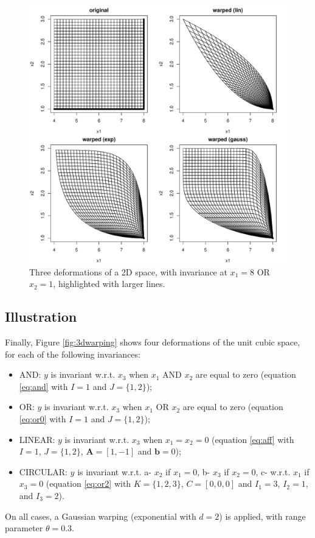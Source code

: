 \begin{figure}[!ht]
\centering
 \includegraphics[width=.8\textwidth]{def2DOR.pdf}
 \caption{Three deformations of a 2D space, with invariance at $x_1=8$ OR $x_2=1$, highlighted with larger lines.}\label{fig:def2DOR}
\end{figure}
% 
% 

\subsection{Illustration}
Finally, Figure \ref{fig:3dwarping} shows four deformations of the unit cubic space, for each of the following invariances:
\begin{itemize}
 \item AND: $y$ is invariant w.r.t. $x_3$ when $x_1$ AND $x_2$ are equal to zero (equation \ref{eq:and} with $I=1$ and $J=\{1,2\}$);
 \item OR: $y$ is invariant w.r.t. $x_3$ when $x_1$ OR $x_2$ are equal to zero  (equation \ref{eq:or0} with $I=1$ and $J=\{1,2\}$);
 \item LINEAR: $y$ is invariant w.r.t. $x_3$ when $x_1=x_2=0$  (equation \ref{eq:aff} with $I=1$, $J=\{1,2\}$, $\mathbf{A}=[1,-1]$ and $\mathbf{b}=0$);
 \item CIRCULAR: $y$ is invariant w.r.t. a- $x_2$ if $x_1=0$, b-  $x_3$ if $x_2=0$, c- w.r.t. $x_1$ if $x_3=0$ (equation \ref{eq:or2} with $K=\{1,2,3\}$, $C=[0,0,0]$ and $I_1=3$, $I_2=1$, and $I_3=2$).
\end{itemize}
On all cases, a Gaussian warping (exponential with $d=2$) is applied, with range parameter $\theta=0.3$.

